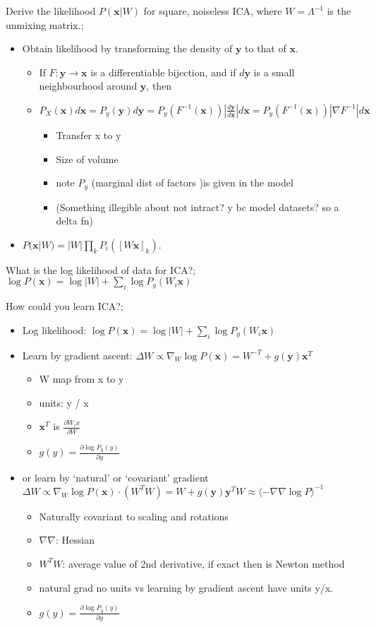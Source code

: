 \documentclass{article}
\begin{document}
Derive the likelihood $P(\mathbf{x}|W)$ for square, noiseless ICA, where $W=\Lambda^{-1}$ is the unmixing matrix.; \begin{itemize} \item Obtain likelihood by transforming the density of $\mathbf{y}$ to that of $\mathbf{x}$. \begin{itemize} \item If $F:\mathbf{y}\to\mathbf{x}$ is a differentiable bijection, and if $d\mathbf{y}$ is a small neighbourhood around $\mathbf{y}$, then \item $P_X(\mathbf{x})d\mathbf{x}=P_y(\mathbf{y})d\mathbf{y}=P_y(F^{-1}(\mathbf{x}))|\frac{d\mathbf{y}}{d\mathbf{x}}|d\mathbf{x}=P_y(F^{-1}(\mathbf{x}))|\nabla F^{-1}|d\mathbf{x}$ \begin{itemize} \item Transfer x to y \item Size of volume  \item note $P_y$ (marginal dist of factors )is given in the model \item (Something illegible about not intract? y bc model datasets? so a delta fn) \end{itemize} \end{itemize} \item $P(\mathbf{x}|W)=|W|\prod_kP_i([W\mathbf{x}]_k)$. \end{itemize}

What is the log likelihood of data for ICA?; $\log P(\mathbf{x})=\log|W|+\sum_i \log P_y(W_i\mathbf{x})$

How could you learn ICA?; \begin{itemize} \item Log likelihood: $\log P(\mathbf{x})=\log|W|+\sum_i \log P_y(W_i\mathbf{x})$  \item Learn by gradient ascent: $\Delta W\propto \nabla_W\log P(\mathbf{x}) = W^{-T}+g(\mathbf{y})\mathbf{x}^T$ \begin{itemize} \item W map from x to y \item units: y / x \item $\mathbf{x}^T$ is $\frac{\partial W_ix}{\partial W}$ \item $g(y)=\frac{\partial \log P_y(y)}{\partial y}$ \end{itemize} \item or learn by `natural' or `covariant' gradient $\Delta W\propto \nabla_W\log P(\mathbf{x})\cdot (W^TW) = W + g(\mathbf{y})\mathbf{y}^TW \approx \langle -\nabla\nabla\log P\rangle^{-1}$ \begin{itemize} \item Naturally covariant to scaling and rotations \item $\nabla\nabla$: Hessian \item $W^TW$: average value of 2nd derivative, if exact then is Newton method \item natural grad no units vs learning by gradient ascent have units y/x. \item $g(y)=\frac{\partial \log P_y(y)}{\partial y}$ \end{itemize} \end{itemize}
\end{document}
